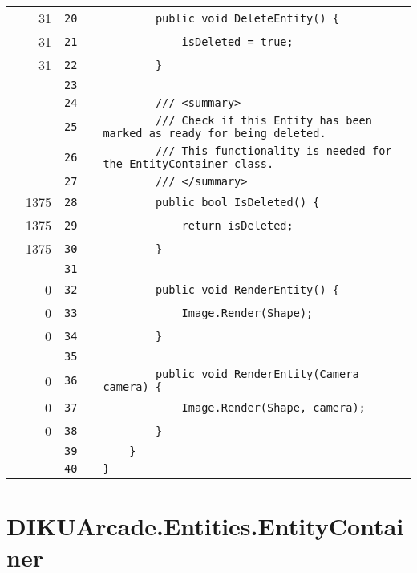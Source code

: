 \documentclass[a4paper,landscape,10pt]{article}
\begin{document}
\begin{longtable}[l]{lrrll}
\cellcolor{green} & 31 & \verb~20~ & & \verb~        public void DeleteEntity() {~\\
\cellcolor{green} & 31 & \verb~21~ & & \verb~            isDeleted = true;~\\
\cellcolor{green} & 31 & \verb~22~ & & \verb~        }~\\
\cellcolor{gray} &  & \verb~23~ & & \verb~~\\
\cellcolor{gray} &  & \verb~24~ & & \verb~        /// <summary>~\\
\cellcolor{gray} &  & \verb~25~ & & \verb~        /// Check if this Entity has been marked as ready for being deleted.~\\
\cellcolor{gray} &  & \verb~26~ & & \verb~        /// This functionality is needed for the EntityContainer class.~\\
\cellcolor{gray} &  & \verb~27~ & & \verb~        /// </summary>~\\
\cellcolor{green} & 1375 & \verb~28~ & & \verb~        public bool IsDeleted() {~\\
\cellcolor{green} & 1375 & \verb~29~ & & \verb~            return isDeleted;~\\
\cellcolor{green} & 1375 & \verb~30~ & & \verb~        }~\\
\cellcolor{gray} &  & \verb~31~ & & \verb~~\\
\cellcolor{red} & 0 & \verb~32~ & & \verb~        public void RenderEntity() {~\\
\cellcolor{red} & 0 & \verb~33~ & & \verb~            Image.Render(Shape);~\\
\cellcolor{red} & 0 & \verb~34~ & & \verb~        }~\\
\cellcolor{gray} &  & \verb~35~ & & \verb~~\\
\cellcolor{red} & 0 & \verb~36~ & & \verb~        public void RenderEntity(Camera camera) {~\\
\cellcolor{red} & 0 & \verb~37~ & & \verb~            Image.Render(Shape, camera);~\\
\cellcolor{red} & 0 & \verb~38~ & & \verb~        }~\\
\cellcolor{gray} &  & \verb~39~ & & \verb~    }~\\
\cellcolor{gray} &  & \verb~40~ & & \verb~}~\\
\end{longtable}
\newpage
\section{DIKUArcade.Entities.EntityContainer}
\end{document}
